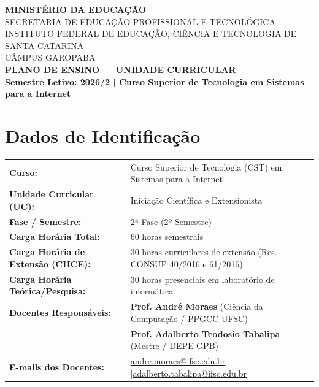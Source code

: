 \documentclass[12pt,a4paper]{article}
\begin{document}
\begin{center}
    {\Large \textbf{MINISTÉRIO DA EDUCAÇÃO}}\\
    {\large SECRETARIA DE EDUCAÇÃO PROFISSIONAL E TECNOLÓGICA}\\
    {\large INSTITUTO FEDERAL DE EDUCAÇÃO, CIÊNCIA E TECNOLOGIA DE SANTA CATARINA}\\
    {\large CÂMPUS GAROPABA}\\[0.4cm]
    {\Large \textbf{PLANO DE ENSINO — UNIDADE CURRICULAR}}\\[0.2cm]
    {\large \textbf{Semestre Letivo: 2026/2 | Curso Superior de Tecnologia em Sistemas para a Internet}}
\end{center}

\vspace{0.3cm}

\section{Dados de Identificação}

\begin{table}[H]
\centering
\small
{}
\begin{tabularx}{\textwidth}{|l|X|}
\hline
\rowcolor{cinzaCabecalho}
\multicolumn{2}{|c|}{\textbf{INFORMAÇÕES DA UNIDADE CURRICULAR}} \\ \hline
\textbf{Curso:} & Curso Superior de Tecnologia (CST) em Sistemas para a Internet \\ \hline
\textbf{Unidade Curricular (UC):} & Iniciação Científica e Extensionista \\ \hline
\textbf{Fase / Semestre:} & 2ª Fase (2º Semestre) \\ \hline
\textbf{Carga Horária Total:} & 60 horas semestrais \\ \hline
\textbf{Carga Horária de Extensão (CHCE):} & 30 horas curriculares de extensão (Res. CONSUP 40/2016 e 61/2016) \\ \hline
\textbf{Carga Horária Teórica/Pesquisa:} & 30 horas presenciais em laboratório de informática \\ \hline
\textbf{Docentes Responsáveis:} & \textbf{Prof. André Moraes} (Ciência da Computação / PPGCC UFSC)\\
 & \textbf{Prof. Adalberto Teodosio Tabalipa} (Mestre / DEPE GPB) \\ \hline
\textbf{E-mails dos Docentes:} & \url{andre.moraes@ifsc.edu.br} \quad|\quad \url{adalberto.tabalipa@ifsc.edu.br} \\ \hline
\end{tabularx}
\end{table}
\end{document}
